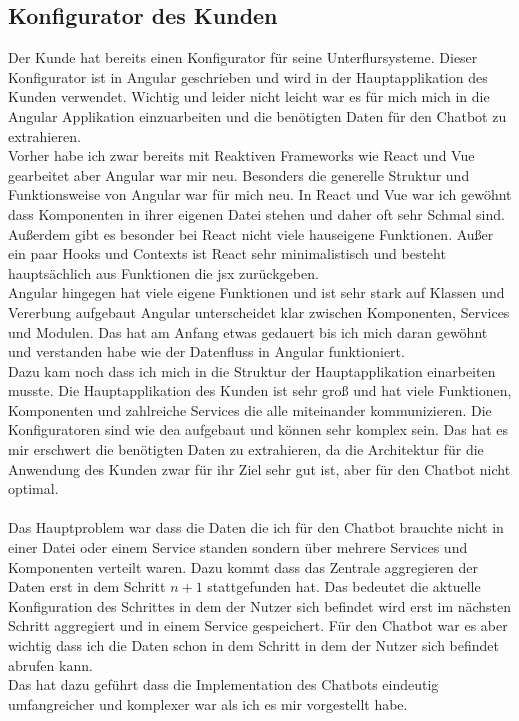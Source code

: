 \subsection{Konfigurator des Kunden}\label{sec:umsetzung_konfigurator}
Der Kunde hat bereits einen Konfigurator für seine Unterflursysteme. Dieser Konfigurator ist in Angular geschrieben und wird in der Hauptapplikation des Kunden verwendet.
Wichtig und leider nicht leicht war es für mich mich in die Angular Applikation einzuarbeiten und die benötigten Daten für den Chatbot zu extrahieren.\\
Vorher habe ich zwar bereits mit Reaktiven Frameworks wie React und Vue gearbeitet aber Angular war mir neu. Besonders die generelle Struktur und Funktionsweise von Angular war für mich neu.
In React und Vue war ich gewöhnt dass Komponenten in ihrer eigenen Datei stehen und daher oft sehr Schmal sind. Außerdem gibt es besonder bei React nicht viele
hauseigene Funktionen. Außer ein paar Hooks und Contexts ist React sehr minimalistisch und besteht hauptsächlich aus Funktionen die \gls{jsx} zurückgeben.\\
Angular hingegen hat viele eigene Funktionen und ist sehr stark auf Klassen und Vererbung aufgebaut Angular unterscheidet klar zwischen Komponenten, Services und Modulen.
Das hat am Anfang etwas gedauert bis ich mich daran gewöhnt und verstanden habe wie der Datenfluss in Angular funktioniert.\\
Dazu kam noch dass ich mich in die Struktur der Hauptapplikation einarbeiten musste. Die Hauptapplikation des Kunden ist sehr groß und hat viele Funktionen, Komponenten und zahlreiche
Services die alle miteinander kommunizieren. Die Konfiguratoren sind wie \gls{dea} aufgebaut und können sehr komplex sein. Das hat es mir erschwert die benötigten Daten zu extrahieren,
da die Architektur für die Anwendung des Kunden zwar für ihr Ziel sehr gut ist, aber für den Chatbot nicht optimal.\\\\
Das Hauptproblem war dass die Daten die ich für den Chatbot brauchte nicht in einer Datei oder einem Service standen sondern über mehrere Services und Komponenten verteilt waren.
Dazu kommt dass das Zentrale aggregieren der Daten erst in dem Schritt $n+1$ stattgefunden hat.
Das bedeutet die aktuelle Konfiguration des Schrittes in dem der Nutzer sich befindet wird erst im nächsten Schritt aggregiert und in einem Service gespeichert.
Für den Chatbot war es aber wichtig dass ich die Daten schon in dem Schritt in dem der Nutzer sich befindet abrufen kann.\\
Das hat dazu geführt dass die Implementation des Chatbots eindeutig umfangreicher und komplexer war als ich es mir vorgestellt habe.

